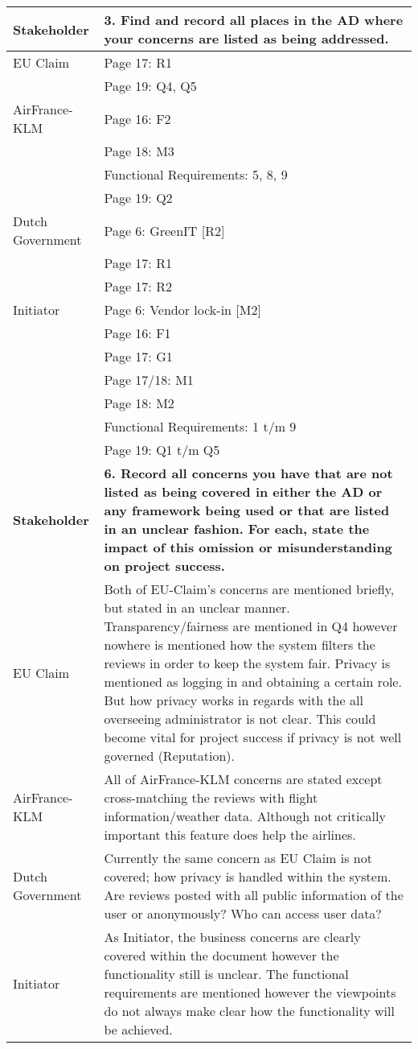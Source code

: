 \begin{longtable}{| l | p{13cm} |}
  \hline
  \textbf{Stakeholder} & \textbf{3. Find and record all places in the AD where your concerns are listed as being addressed.} \\
  \hline
  EU Claim & Page 17: R1\\ 
& Page 19: Q4, Q5 \\
  \hline
  AirFrance-KLM & Page 16: F2 \\
    & Page 18: M3 \\
    & Functional Requirements: 5, 8, 9 \\
    & Page 19: Q2\\
  \hline
  Dutch Government & Page 6: GreenIT [R2] \\
    &Page 17: R1\\
    &Page 17: R2 \\
  \hline
  Initiator & Page 6: Vendor lock-in [M2] \\
    & Page 16: F1 \\
    & Page 17: G1 \\
    & Page 17/18: M1 \\
    & Page 18: M2 \\
    & Functional Requirements: 1 t/m 9 \\
    & Page 19: Q1 t/m Q5\\
  \hline

  \hline
  \textbf{Stakeholder} & \textbf{6. Record all concerns you have that are not listed as being covered in either the AD or any framework being used or that are listed in an unclear fashion. For each, state the impact of this omission or misunderstanding on project success.} \\
  \hline
  EU Claim & Both of EU-Claim's concerns are mentioned briefly, but stated in an unclear manner. Transparency/fairness are mentioned in Q4 however nowhere is mentioned how the system filters the reviews in order to keep the system fair. Privacy is mentioned as logging in and obtaining a certain role. But how privacy works in regards with the all overseeing administrator is not clear. This could become vital for project success if privacy is not well governed (Reputation). \\
  \hline
  AirFrance-KLM & All of AirFrance-KLM concerns are stated except cross-matching the reviews with flight information/weather data. Although not critically important this feature does help the airlines.\\
  \hline
  Dutch Government & Currently the same concern as EU Claim is not covered; how privacy is handled within the system. Are reviews posted with all public information of the user or anonymously? Who can access user data? \\
  \hline
  Initiator & As Initiator, the business concerns are clearly covered within the document however the functionality still is unclear. The functional requirements are mentioned however the viewpoints do not always make clear how the functionality will be achieved. \\
  \hline


\end{longtable}
